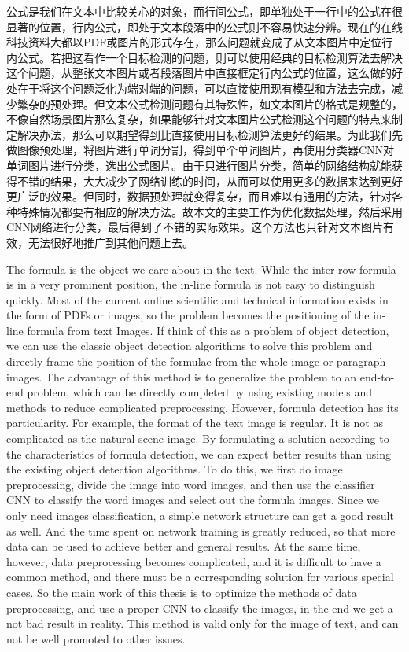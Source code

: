 

\begin{cabstract}
  公式是我们在文本中比较关心的对象，而行间公式，即单独处于一行中的公式在很显著的位置，行内公式，即处于文本段落中的公式则不容易快速分辨。现在的在线科技资料大都以PDF或图片的形式存在，那么问题就变成了从文本图片中定位行内公式。若把这看作一个目标检测的问题，则可以使用经典的目标检测算法去解决这个问题，从整张文本图片或者段落图片中直接框定行内公式的位置，这么做的好处在于将这个问题泛化为端对端的问题，可以直接使用现有模型和方法去完成，减少繁杂的预处理。但文本公式检测问题有其特殊性，如文本图片的格式是规整的，不像自然场景图片那么复杂，如果能够针对文本图片公式检测这个问题的特点来制定解决办法，那么可以期望得到比直接使用目标检测算法更好的结果。为此我们先做图像预处理，将图片进行单词分割，得到单个单词图片，再使用分类器CNN对单词图片进行分类，选出公式图片。由于只进行图片分类，简单的网络结构就能获得不错的结果，大大减少了网络训练的时间，从而可以使用更多的数据来达到更好更广泛的效果。但同时，数据预处理就变得复杂，而且难以有通用的方法，针对各种特殊情况都要有相应的解决方法。故本文的主要工作为优化数据处理，然后采用CNN网络进行分类，最后得到了不错的实际效果。这个方法也只针对文本图片有效，无法很好地推广到其他问题上去。
\end{cabstract}

\begin{eabstract}
The formula is the object we care about in the text. While the inter-row formula is in a very prominent position, the in-line formula is not easy to distinguish quickly. Most of the current online scientific and technical information exists in the form of PDFs or images, so the problem becomes the positioning of the in-line formula from text Images. If think of this as a problem of object detection, we can use the classic object detection algorithms to solve this problem and directly frame the position of the formulae from the whole image or paragraph images. The advantage of this method is to generalize the problem to an end-to-end problem, which can be directly completed by using existing models and methods to reduce complicated preprocessing. However, formula detection has its particularity. For example, the format of the text image is regular. It is not as complicated as the natural scene image. By formulating a solution according to the characteristics of formula detection, we can expect better results than using the existing object detection algorithms. To do this, we first do image preprocessing, divide the image into word images, and then use the classifier CNN to classify the word images and select out the formula images. Since we only need images classification, a simple network structure can get a good result as well. And the time spent on network training is greatly reduced, so that more data can be used to achieve better and general results. At the same time, however, data preprocessing becomes complicated, and it is difficult to have a common method, and there must be a corresponding solution for various special cases. So the main work of this thesis is to optimize the methods of data preprocessing, and use a proper CNN to classify the images, in the end we get a not bad result in reality. This method is valid only for the image of
text, and can not be well promoted to other issues.
\end{eabstract}
